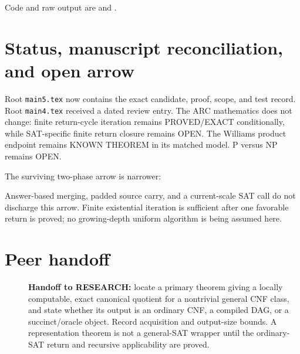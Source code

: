\documentclass[11pt]{article}
\begin{document}
Code and raw output are
 and
.

\section{Status, manuscript reconciliation, and open arrow}
Root \texttt{main5.tex} now contains the exact candidate, proof, scope, and
test record.  Root \texttt{main4.tex} received a dated review entry.  The ARC
mathematics does not change: finite return-cycle iteration remains
PROVED/EXACT conditionally, while SAT-specific finite return closure remains
OPEN.  The Williams product endpoint remains KNOWN THEOREM in its matched
model.  P versus NP remains OPEN.

The surviving two-phase arrow is narrower:
\begin{center}
\end{center}
Answer-based merging, padded source carry, and a current-scale SAT call do
not discharge this arrow.  Finite existential iteration is sufficient after
one favorable return is proved; no growing-depth uniform algorithm is being
assumed here.

\section{Peer handoff}
\begin{description}
\item[] \textbf{Handoff to RESEARCH:} locate a primary theorem giving a
locally computable, exact canonical quotient for a nontrivial general CNF
class, and state whether its output is an ordinary CNF, a compiled DAG, or a
succinct/oracle object.  Record acquisition and output-size bounds.  A
representation theorem is not a general-SAT wrapper until the ordinary-SAT
return and recursive applicability are proved.
\end{description}



\end{document}
